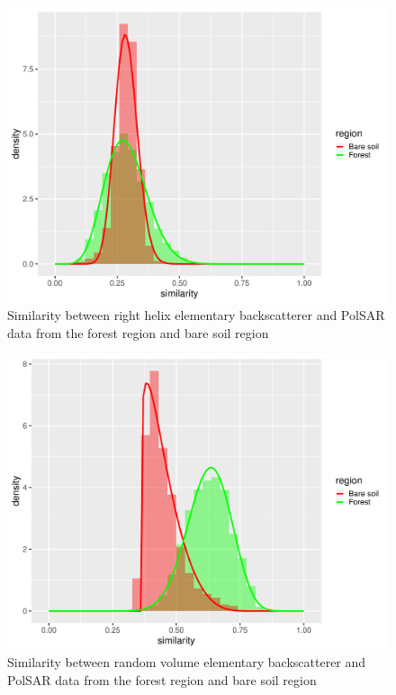\documentclass[conference]{IEEEtran}
\begin{document}
\begin{figure}[!ht]
    \centering
    \includegraphics[width = .9\linewidth, height = .7\linewidth]{../../../Figures/paper_19_05/rh.pdf}
    \caption{Similarity between right helix elementary backscatterer and PolSAR data from the forest region and bare soil region}
    \label{fig:rh}
\end{figure}

\begin{figure}[!ht]
    \centering
    \includegraphics[width = .9\linewidth, height = .7\linewidth]{../../../Figures/paper_19_05/rv.pdf}
    \caption{Similarity between random volume elementary backscatterer and PolSAR data from the forest region and bare soil region}
    \label{fig:rv}
\end{figure}
\end{document}
